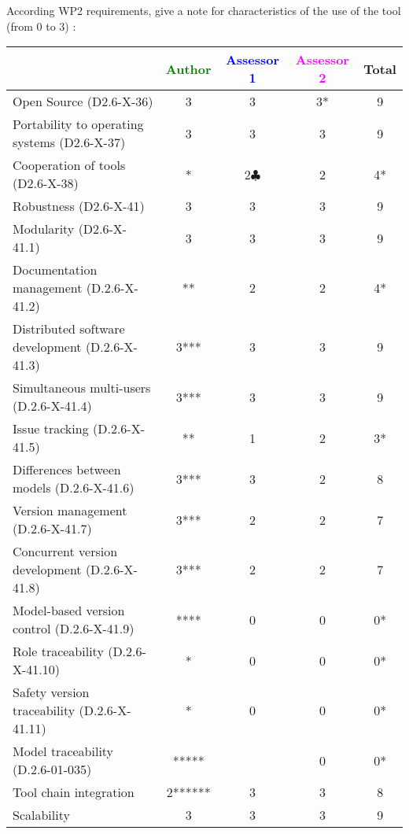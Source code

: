 According WP2 requirements, give a note for characteristics of the use of the tool (from 0 to 3) :

\begin{tabular}{|l | c | c | c | c|}
\hline
& \textcolor{green}{Author} & \textcolor{blue}{Assessor 1} & \textcolor{magenta}{Assessor 2} & Total \\
\hline
Open Source (D2.6-X-36) &3 &3 &3* & 9 \\
\hline
Portability to operating systems (D2.6-X-37) &3 &3 &3 & 9 \\
\hline
Cooperation of tools (D2.6-X-38) &* &2$\clubsuit$ &2 & 4* \\
\hline
Robustness (D2.6-X-41) &3 &3 &3 & 9 \\
\hline
Modularity (D2.6-X-41.1) &3 &3 &3 & 9 \\
\hline
Documentation management (D.2.6-X-41.2) &** &2 &2 & 4* \\
\hline
Distributed software development (D.2.6-X-41.3) &3*** &3 &3 & 9 \\
\hline
Simultaneous multi-users (D.2.6-X-41.4) &3*** & 3&3 & 9 \\
\hline
Issue tracking (D.2.6-X-41.5) &** &1 &2 & 3* \\
\hline
Differences between models (D.2.6-X-41.6) &3*** &3 &2 & 8 \\
\hline
Version management (D.2.6-X-41.7) &3*** &2 &2 & 7 \\
\hline
Concurrent version development (D.2.6-X-41.8) &3*** &2 &2 & 7 \\
\hline
Model-based version control (D.2.6-X-41.9) &**** &0 &0 & 0* \\
\hline
Role traceability (D.2.6-X-41.10) &* &0 &0 & 0* \\
\hline
Safety version traceability (D.2.6-X-41.11) &* &0 &0 & 0* \\
\hline
Model traceability (D.2.6-01-035) &***** & &0 & 0* \\
\hline
Tool chain integration &2****** &3 &3 & 8 \\
\hline
Scalability &3 &3 &3 & 9 \\
\hline
\end{tabular}

